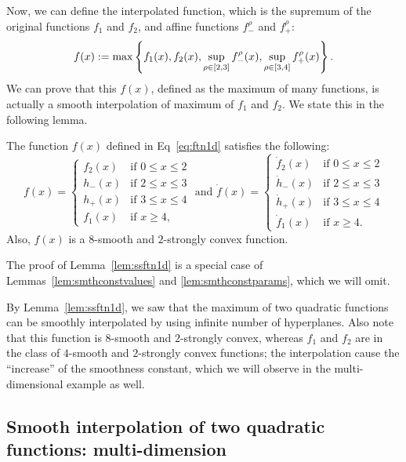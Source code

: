 Now, we can define the interpolated function, which is the supremum of the original functions
$f_1$ and $f_2$, and affine functions $f_-^\rho$ and $f_+^\rho$:
\begin{equation}
\label{eq:ftn1d}
f(x) := \max \left \{ 
f_1(x), f_2(x), 
\sup_{\rho \in [2,3]} f_-^\rho(x),
\sup_{\rho \in [3,4]} f_+^\rho(x) 
\right \}.
\end{equation}
We can prove that this $f(x)$, defined as the maximum of many functions,
is actually a smooth interpolation of maximum of $f_1$ and $f_2$. We state this in 
the following lemma. 
\begin{lemma}
	\label{lem:ssftn1d}
	The function $f(x)$ defined in Eq~\eqref{eq:ftn1d} satisfies the following:
	\begin{equation*}
		f(x) = 
		\begin{cases}
			f_2(x) & \text{if } 0 \leq x \leq 2\\
			h_-(x) & \text{if } 2 \leq x \leq 3\\
			h_+(x) & \text{if } 3 \leq x \leq 4\\
			f_1(x) & \text{if } x \geq 4,
		\end{cases}
		\text{ and }
		\dot f(x) = 
		\begin{cases}
			\dot f_2(x) & \text{if } 0 \leq x \leq 2\\
			\dot h_-(x) & \text{if } 2 \leq x \leq 3\\
			\dot h_+(x) & \text{if } 3 \leq x \leq 4\\
			\dot f_1(x) & \text{if } x \geq 4.
		\end{cases}
	\end{equation*}
	Also, $f(x)$ is a $8$-smooth and $2$-strongly convex function.
\end{lemma}
The proof of Lemma~\ref{lem:ssftn1d} is a special case of Lemmas~\ref{lem:smthconstvalues} and \ref{lem:smthconstparams}, which we will omit.

By Lemma~\ref{lem:ssftn1d}, we saw that the maximum of 
two quadratic functions can be smoothly interpolated by using infinite number of hyperplanes. 
Also note that this function is $8$-smooth and $2$-strongly convex,
whereas $f_1$ and $f_2$ are in the class of $4$-smooth and $2$-strongly convex functions; the interpolation cause the ``increase'' of the smoothness constant,
which we will observe in the multi-dimensional example as well.

\subsection{Smooth interpolation of two quadratic functions: multi-dimension}
\label{sec:constsscvx-md}
